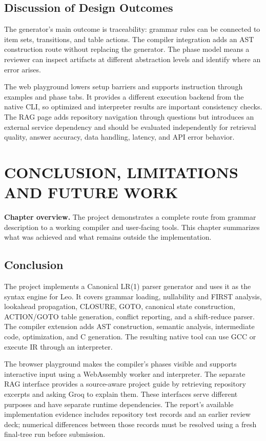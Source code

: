\documentclass[12pt,a4paper,oneside]{report}
\newcommand{\chapterintro}[1]{\noindent\textbf{Chapter overview.} #1\par\vspace{8pt}}
\begin{document}
\section{Discussion of Design Outcomes}
The generator's main outcome is traceability: grammar rules can be connected to item sets, transitions, and table actions. The compiler integration adds an AST construction route without replacing the generator. The phase model means a reviewer can inspect artifacts at different abstraction levels and identify where an error arises.

The web playground lowers setup barriers and supports instruction through examples and phase tabs. It provides a different execution backend from the native CLI, so optimized and interpreter results are important consistency checks. The RAG page adds repository navigation through questions but introduces an external service dependency and should be evaluated independently for retrieval quality, answer accuracy, data handling, latency, and API error behavior.

\chapter{CONCLUSION, LIMITATIONS AND FUTURE WORK}
\chapterintro{The project demonstrates a complete route from grammar description to a working compiler and user-facing tools. This chapter summarizes what was achieved and what remains outside the implementation.}

\section{Conclusion}
The project implements a Canonical LR(1) parser generator and uses it as the syntax engine for Leo. It covers grammar loading, nullability and FIRST analysis, lookahead propagation, CLOSURE, GOTO, canonical state construction, ACTION/GOTO table generation, conflict reporting, and a shift-reduce parser. The compiler extension adds AST construction, semantic analysis, intermediate code, optimization, and C generation. The resulting native tool can use GCC or execute IR through an interpreter.

The browser playground makes the compiler's phases visible and supports interactive input using a WebAssembly worker and interpreter. The separate RAG interface provides a source-aware project guide by retrieving repository excerpts and asking Groq to explain them. These interfaces serve different purposes and have separate runtime dependencies. The report's available implementation evidence includes repository test records and an earlier review deck; numerical differences between those records must be resolved using a fresh final-tree run before submission.
\end{document}
